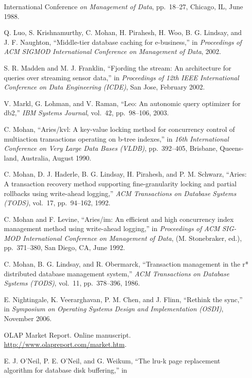 \documentclass[a4paper,11pt,twoside,openright]{book}
\begin{document}
\begin{enumerate}[label={[\arabic*]}]
{  International Conference} \emph{on Management of Data}, pp.~18--27,
  Chicago, IL, June 1988.
\item
  Q. Luo, S. Krishnamurthy, C. Mohan, H. Pirahesh, H. Woo, B. G.
  Lindsay, and J. F. Naughton, ``Middle-tier database caching for
  e-business,'' in \emph{Proceedings} \emph{of ACM SIGMOD International
  Conference on Management of Data}, 2002.
\item
  S. R. Madden and M. J. Franklin, ``Fjording the stream: An
  architecture for queries over streaming sensor data,'' in
  \emph{Proceedings of 12th IEEE International} \emph{Conference on Data
  Engineering (ICDE)}, San Jose, February 2002.
\item
  V. Markl, G. Lohman, and V. Raman, ``Leo: An autonomic query optimizer
  for db2,'' \emph{IBM Systems Journal}, vol.~42, pp.~98--106, 2003.
\item
  C. Mohan, ``Aries/kvl: A key-value locking method for concurrency
  control of multiaction transactions operating on b-tree indexes,'' in
  \emph{16th International} \emph{Conference on Very Large Data Bases
  (VLDB)}, pp.~392--405, Brisbane, Queens-land, Australia, August 1990.
\item
  C. Mohan, D. J. Haderle, B. G. Lindsay, H. Pirahesh, and P. M.
  Schwarz, ``Aries: A transaction recovery method supporting
  fine-granularity locking and partial rollbacks using write-ahead
  logging,'' \emph{ACM Transactions on Database} \emph{Systems (TODS)},
  vol.~17, pp.~94--162, 1992.
\item
  C. Mohan and F. Levine, ``Aries/im: An efficient and high concurrency
  index management method using write-ahead logging,'' in
  \emph{Proceedings of ACM SIG-MOD International Conference on
  Management of Data}, (M. Stonebraker, ed.), pp.~371--380, San Diego,
  CA, June 1992.
\item
  C. Mohan, B. G. Lindsay, and R. Obermarck, ``Transaction management in
  the r* distributed database management system,'' \emph{ACM
  Transactions on Database} \emph{Systems (TODS)}, vol.~11,
  pp.~378--396, 1986.
\item
  E. Nightingale, K. Veerarghavan, P. M. Chen, and J. Flinn, ``Rethink
  the sync,'' in \emph{Symposium on Operating Systems Design and
  Implementation (OSDI)}, November 2006.
\item
  OLAP Market Report. Online manuscript.
  \url{http://www.olapreport.com/market.htm}.
\item
  E. J. O'Neil, P. E. O'Neil, and G. Weikum, ``The lru-k page
  replacement algorithm for database disk buffering,'' in

\end{enumerate}
\end{document}
